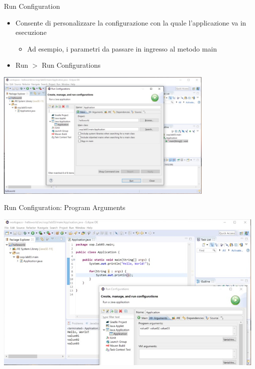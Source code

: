 \documentclass[presentation]{beamer}
\begin{document}
\begin{frame}{Run Configuration}
\begin{itemize}
\item Consente di personalizzare la configurazione con la quale l'applicazione va in esecuzione
\begin{itemize}
\item Ad esempio, i parametri da passare in ingresso al metodo main
\end{itemize}
\item Run $>$ Run Configurations
\end{itemize}
\begin{center}
\includegraphics[width=0.8\textwidth]{img/eclipse-screenshots/eclipse-ide-04d.jpg}
\end{center}
\end{frame}

\begin{frame}{Run Configuration: Program Arguments}
\begin{center}
\includegraphics[width=\textwidth]{img/eclipse-screenshots/eclipse-ide-04e.jpg}
\end{center}
\end{frame}
\end{document}
